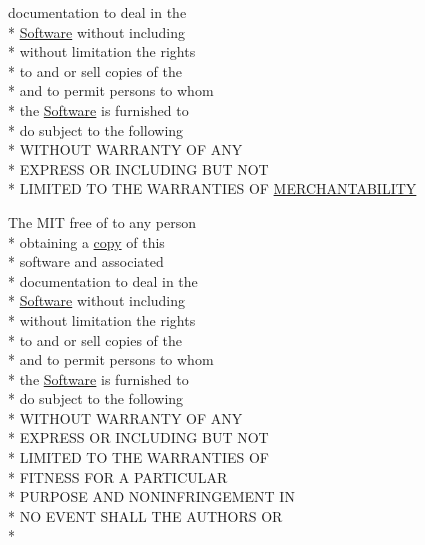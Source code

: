 \begin{DoxyCompactItemize}
documentation to deal in the \\*
\hyperlink{LICENSE_8txt_a22a1529885b3e9d66b0c72fe604fc3dc}{Software} without including \\*
without limitation the rights \\*
to and or sell copies of the \\*
and to permit persons to whom \\*
the \hyperlink{LICENSE_8txt_a22a1529885b3e9d66b0c72fe604fc3dc}{Software} is furnished to \\*
do subject to the following \\*
W\-I\-T\-H\-O\-U\-T W\-A\-R\-R\-A\-N\-T\-Y O\-F A\-N\-Y \\*
E\-X\-P\-R\-E\-S\-S O\-R I\-N\-C\-L\-U\-D\-I\-N\-G B\-U\-T N\-O\-T \\*
L\-I\-M\-I\-T\-E\-D T\-O T\-H\-E W\-A\-R\-R\-A\-N\-T\-I\-E\-S O\-F \hyperlink{LICENSE_8txt_a82e4fcb28d3925b81ac5f50e2b22c270}{M\-E\-R\-C\-H\-A\-N\-T\-A\-B\-I\-L\-I\-T\-Y}
\item 
The M\-I\-T free of to any person \\*
obtaining a \hyperlink{LICENSE_8txt_aff1d4c6b756ebf691fa44a0904f68658}{copy} of this \\*
software and associated \\*
documentation to deal in the \\*
\hyperlink{LICENSE_8txt_a22a1529885b3e9d66b0c72fe604fc3dc}{Software} without including \\*
without limitation the rights \\*
to and or sell copies of the \\*
and to permit persons to whom \\*
the \hyperlink{LICENSE_8txt_a22a1529885b3e9d66b0c72fe604fc3dc}{Software} is furnished to \\*
do subject to the following \\*
W\-I\-T\-H\-O\-U\-T W\-A\-R\-R\-A\-N\-T\-Y O\-F A\-N\-Y \\*
E\-X\-P\-R\-E\-S\-S O\-R I\-N\-C\-L\-U\-D\-I\-N\-G B\-U\-T N\-O\-T \\*
L\-I\-M\-I\-T\-E\-D T\-O T\-H\-E W\-A\-R\-R\-A\-N\-T\-I\-E\-S O\-F \\*
F\-I\-T\-N\-E\-S\-S F\-O\-R A P\-A\-R\-T\-I\-C\-U\-L\-A\-R \\*
P\-U\-R\-P\-O\-S\-E A\-N\-D N\-O\-N\-I\-N\-F\-R\-I\-N\-G\-E\-M\-E\-N\-T I\-N \\*
N\-O E\-V\-E\-N\-T S\-H\-A\-L\-L T\-H\-E A\-U\-T\-H\-O\-R\-S O\-R \\*

\end{DoxyCompactItemize}
